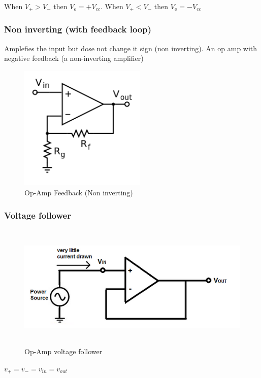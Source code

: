 \documentclass{article}
\begin{document}
When $V_+>V_-$ then $V_o=+V_{cc}$. When $V_+<V_-$ then $V_o=-V_{cc}$

\subsubsection{Non inverting (with feedback loop)}
Amplefies the input but dose not change it sign (non inverting).
An op amp with negative feedback (a non-inverting amplifier)

\begin{figure}[h]
    \vspace{10mm}
    \centering
    \includegraphics[width=6cm, height=6cm]{image/Operational_amplifier_noninverting.png}
    \caption{Op-Amp Feedback (Non inverting)}
\end{figure}

\newpage
\subsubsection{Voltage follower}
\begin{figure}[h]
    \vspace{10mm}
    \centering
    \includegraphics[width=12cm, height=6cm]{image/op-amp-voltage-follower.png}
    \caption{Op-Amp voltage follower}
\end{figure}
$v_+=v_-=v_{in}=v_{out}$

\newpage
\end{document}
